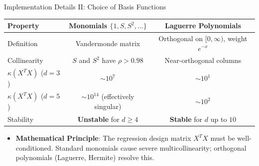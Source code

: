 \documentclass[10pt,aspectratio=169]{beamer}
\begin{document}
\begin{frame}{Implementation Details II: Choice of Basis Functions}

\begin{center} 
\small
\renewcommand{\arraystretch}{1.2}
\begin{tabular}{lcc}
\toprule
\textbf{Property} & \textbf{Monomials} $\{1, S, S^2, \dots\}$ & \textbf{Laguerre Polynomials} \\
\midrule
Definition & Vandermonde matrix & Orthogonal on $[0,\infty)$, weight $e^{-x}$ \\
Collinearity & $S$ and $S^2$ have $\rho > 0.98$ & Near-orthogonal columns \\
$\kappa(X^TX)$ ($d=3$) & $\sim 10^7$ & $\sim 10^1$ \\
$\kappa(X^TX)$ ($d=5$) & $\sim 10^{14}$ (effectively singular) & $\sim 10^2$ \\
Stability & \textcolor{errorColor}{\textbf{Unstable} for $d \ge 4$} & \textbf{Stable} for $d$ up to $10$ \\
\bottomrule
\end{tabular}
\end{center}

\vspace{0.4cm}
\begin{itemize}
    \item \textbf{Mathematical Principle}: The regression design matrix $X^TX$ must be well-conditioned. Standard monomials cause severe multicollinearity; orthogonal polynomials (Laguerre, Hermite) resolve this.
\end{itemize}
\end{frame}
\end{document}
